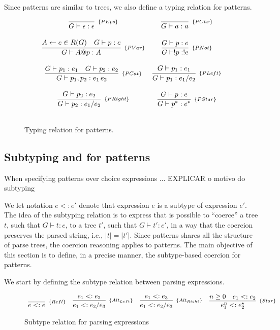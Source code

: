 Since patterns are similar to trees, we also define a typing relation for patterns.

\begin{figure}[H]
  \[
    \begin{array}{cc}
      \infer[_{\{PEps\}}]{G \vdash \epsilon : \epsilon}{} &
      \infer[_{\{PChr\}}]{G\vdash a : a}{} \\ \\
      \infer[_{\{PVar\}}]{ G \vdash A@p : A}
                      {A \leftarrow e \in R(G) & G\vdash p : e} &
      \infer[_{\{PNot\}}]{G\vdash !p: ! e}{G\vdash p : e}\\ \\
      \infer[_{\{PCat\}}]{G\vdash p_1, p_2 : e_1\,e_2}
                      {G\vdash  p_1 : e_1 & G\vdash p_2 : e_2} &
      \infer[_{\{PLeft\}}]{G\vdash p_1 : e_1 / e_2}
                       {G\vdash p_1 : e_1} \\ \\
      \infer[_{\{PRight\}}]{G\vdash p_2 : e_1 / e_2}
                       {G\vdash p_2 : e_2} &
      \infer[_{\{PStar\}}]{G \vdash  p^ * : e^*}{G \vdash p : e}\\ \\
   \end{array}
  \]
  \centering
  \caption{Typing relation for patterns.}
  \label{fig:pattern-typing}
\end{figure}

\subsection{Subtyping and for patterns}

When specifying patterns over choice expressions ... EXPLICAR o motivo do subtyping

We let notation $e <: e'$ denote that expression $e$ is a subtype of expression $e'$.
The idea of the subtyping relation is to express that is possible to ``coerce'' a
tree $t$, such that $G \vdash t : e$,  to a tree $t'$, such that $G \vdash t' : e'$,
in a way that the coercion preserves the parsed string, i.e., $|t| = |t'|$.
Since patterns shares all the structure of parse trees, the coercion reasoning
applies to patterns. The main objective of this section is to define, in a precise
manner, the subtype-based coercion for patterns.

We start by defining the subtype relation between parsing expressions.

\begin{figure*}[ht]
    \[
        \begin{array}{cccc}
            \infer[_{\{Refl\}}]{e <: e}{} &
            \infer[_{\{Alt_{Left}\}}]{e_1 <: e_2 / e_3}{e_1 <: e_2} &
            \infer[_{\{Alt_{Right}\}}]{e_1 <: e_2 / e_3}{e_1 <: e_3} &
            \infer[_{\{Star\}}]{e_1^n <: e_2^\star}{n \geq 0 & e_1 <: e_2}
        \end{array}
    \]
    \centering
    \caption{Subtype relation for parsing expressions}
    \label{fig:subtype-relation}
\end{figure*}

